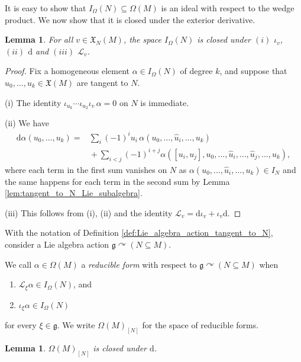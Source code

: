 \documentclass[pdftex]{sigma}
\numberwithin{equation}{section}
\newtheorem{Lemma}[Theorem]{Lemma}
\newcommand{\g}{\mathfrak{g}}
\newcommand{\tgtvanform}{I_{\Omega}(N)}
\renewcommand{\L}{\mathscr{L}}
\newcommand{\X}{\mathfrak{X}}
\renewcommand{\subset}{\subseteq}
\renewcommand{\d}{\mathrm{d}}
\begin{document}
It is easy to show that $I_\Omega(N)\subset\Omega(M)$ is an ideal with respect to the wedge product. We now show that it is closed under the exterior derivative.

\begin{Lemma}\label{lem:closure_of_I_Omega(N)}
	For all $v\in\X_N(M)$, the space $\tgtvanform$ is closed under $(i)$ $\iota_v$, $(ii)$ $\d$ and $(iii)$ $\L_v$.
\end{Lemma}

\begin{proof}
	Fix a homogeneous element $\alpha\in \tgtvanform$ of degree $k$, and suppose that $u_0,\dots,u_k\in\X(M)$ are tangent to $N$.

(i) The identity $\iota_{u_k}\cdots\iota_{u_2}\iota_v\,\alpha=0$ on $N$ is immediate.

(ii) We have
			\begin{align*}
				\d\alpha(u_0,\dots,u_k)
={}&	\sum_i (-1)^i u_i \,\alpha(u_0,\dots,\hat{u}_i,\dots,u_k)			\\
				&{}	+\sum_{i<j}(-1)^{i+j} \alpha([u_i,u_j],u_0,\dots,\hat{u}_i,\dots,\hat{u}_j,\dots,u_k),
			\end{align*}
			where each term in the first sum vanishes on $N$ as $\alpha(u_0,\dots,\hat{u}_i,\dots,u_k)\in I_N$
			and the same happens for each term in the second sum by Lemma \ref{lem:tangent_to_N_Lie_subalgebra}.

(iii) This follows from (i), (ii) and the identity $\L_v=\d\iota_v+\iota_v\d$.
\end{proof}

With the notation of Definition \ref{def:Lie_algebra_action_tangent_to_N}, consider a Lie algebra action $\g\curvearrowright(N\subset M)$.

\begin{Definition}\label{def:reducible_form}\samepage
	We call $\alpha\in\Omega(M)$ a \emph{reducible form} with respect to $\g\curvearrowright (N\subset M)$ when
	\begin{enumerate}\itemsep=0pt
		\item[(i)] $\L_\xi\alpha\in \tgtvanform$, and
		\item[(ii)] $\iota_\xi\alpha\in \tgtvanform$
	\end{enumerate}
	for every $\xi\in\g$. We write $\Omega(M)_{[N]}$ for the space of reducible forms.
\end{Definition}

\begin{Lemma}\label{lem:reducible_forms_closed_under_d}
	$\Omega(M)_{[N]}$ is closed under $\d$.
\end{Lemma}
\end{document}
